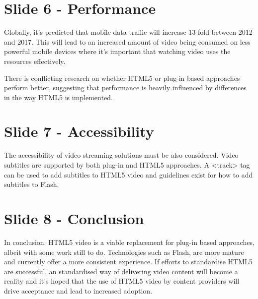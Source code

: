\documentclass[a4paper]{article}
\begin{document}
\section*{Slide 6 - Performance}
Globally, it's predicted that mobile data traffic will increase 13-fold between 2012 and 2017. This will lead to an increased amount of video being consumed on less powerful mobile devices where it's important that watching video uses the resources effectively. 

There is conflicting research on whether HTML5 or plug-in based approaches perform better, suggesting that performance is heavily influenced by differences in the way HTML5 is implemented.

\section*{Slide 7 - Accessibility}
The accessibility of video streaming solutions must be also considered. Video subtitles are supported by both plug-in and HTML5 approaches. A <track> tag can be used to add subtitles to HTML5 video and guidelines exist for how to add subtitles to Flash.


\section*{Slide 8 - Conclusion}
In conclusion. HTML5 video is a viable replacement for plug-in based approaches, albeit with some work still to do. Technologies such as Flash, are more mature and currently offer a more consistent experience. If efforts to standardise HTML5 are successful, an standardised way of delivering video content will become a reality and it's hoped that the use of HTML5 video by content providers will drive acceptance and lead to increased adoption.
\end{document}
